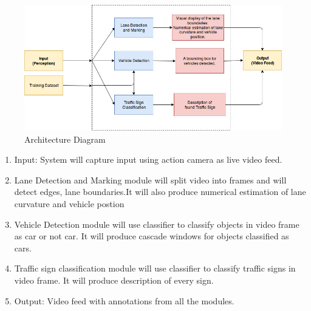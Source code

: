 \documentclass[12pt,a4paper,final]{article}
\begin{document}
\begin{flushleft}
\begin{figure}[H]
\begin{center}
\includegraphics[scale=0.5]{Architecture.jpg}
\caption{Architecture Diagram}
\end{center}
\end{figure}
\begin{enumerate}
\item
Input: System will capture input using action camera as live video feed.
\item
Lane Detection and Marking module will split video into frames and will detect edges, lane boundaries.It will also produce numerical estimation of lane curvature and vehicle postion

\item
Vehicle Detection module will use classifier to classify objects in video frame as car or not car. It will produce cascade windows for objects classified as cars.


\item
Traffic sign classification module will use classifier to classify traffic signs in video frame. It will produce description of every sign.

\item
Output: Video feed with annotations from all the modules.


\end{enumerate}

\newpage
\noindent

\end{flushleft}
\end{document}
